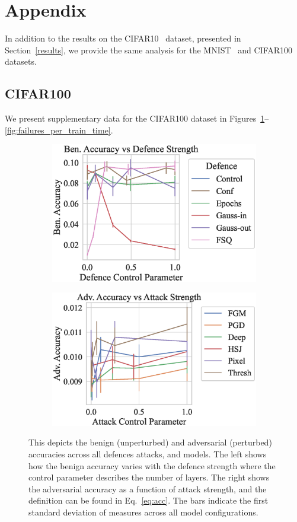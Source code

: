 \clearpage
\onecolumn
\section{Appendix}
\label{appendix}

In addition to the results on the CIFAR10~\citep{cifar} dataset, presented in Section~\ref{results}, we provide the same analysis for the MNIST~\citep{mnist} and CIFAR100~\citep{cifar} datasets.

\subsection{CIFAR100}

We present supplementary data for the CIFAR100 dataset in Figures~\ref{fig:strength}--\ref{fig:failures_per_train_time}.

\begin{figure}[h!]
    \centering
    \begin{subfigure}
        \centering
        \includegraphics[trim={0 20pt 0 10pt},clip,width=.4\textwidth]{cifar100/def_param_vs_accuracy.eps}
    \end{subfigure}
    \begin{subfigure}
        \centering
        \includegraphics[trim={0 20pt 0 10pt},clip,width=.4\textwidth]{cifar100/atk_param_vs_accuracy.eps}
    \end{subfigure}
    \caption{This depicts the benign (unperturbed) and adversarial (perturbed) accuracies across all defences attacks, and models. The left shows how the benign accuracy varies with the defence strength where the control parameter describes the number of layers. The right shows the adversarial accuracy as a function of attack strength, and the definition can be found in Eq.~\ref{eq:acc}. The bars indicate the first standard deviation of measures across all model configurations.}
    \label{fig:strength}
\end{figure}


